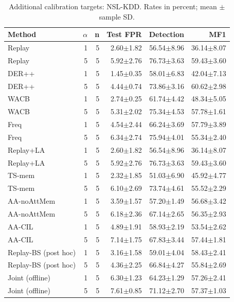 \begin{table}[t]
\centering\scriptsize
\setlength{\tabcolsep}{3.8pt}
\caption{Additional calibration targets: NSL-KDD. Rates in percent; mean $\pm$ sample SD.}\label{tab:alpha-nsl}
\begin{tabular}{lrrrrr}
\toprule
Method & $\alpha$ & n & Test FPR & Detection & MF1 \\
\midrule
Replay & 1 & 5 & 2.60$\pm$1.82 & 56.54$\pm$8.96 & 36.14$\pm$8.07 \\
Replay & 5 & 5 & 5.92$\pm$2.76 & 76.73$\pm$3.63 & 59.43$\pm$3.60 \\
DER++ & 1 & 5 & 1.45$\pm$0.35 & 58.01$\pm$6.83 & 42.04$\pm$7.13 \\
DER++ & 5 & 5 & 4.44$\pm$0.74 & 73.86$\pm$3.16 & 60.62$\pm$2.98 \\
WACB & 1 & 5 & 2.74$\pm$0.25 & 61.74$\pm$4.42 & 48.34$\pm$5.05 \\
WACB & 5 & 5 & 5.31$\pm$2.02 & 75.34$\pm$4.53 & 57.78$\pm$1.61 \\
Freq & 1 & 5 & 4.54$\pm$2.44 & 66.24$\pm$3.69 & 57.79$\pm$3.89 \\
Freq & 5 & 5 & 6.34$\pm$2.74 & 75.94$\pm$4.01 & 55.34$\pm$2.40 \\
Replay+LA & 1 & 5 & 2.60$\pm$1.82 & 56.54$\pm$8.96 & 36.14$\pm$8.07 \\
Replay+LA & 5 & 5 & 5.92$\pm$2.76 & 76.73$\pm$3.63 & 59.43$\pm$3.60 \\
TS-mem & 1 & 5 & 2.32$\pm$1.85 & 51.03$\pm$6.90 & 45.92$\pm$4.77 \\
TS-mem & 5 & 5 & 6.10$\pm$2.69 & 73.74$\pm$4.61 & 55.52$\pm$2.29 \\
AA-noAttMem & 1 & 5 & 3.59$\pm$1.57 & 57.20$\pm$1.49 & 56.68$\pm$3.42 \\
AA-noAttMem & 5 & 5 & 6.18$\pm$2.36 & 67.14$\pm$2.65 & 56.35$\pm$2.93 \\
AA-CIL & 1 & 5 & 4.89$\pm$1.91 & 58.93$\pm$2.19 & 53.54$\pm$2.62 \\
AA-CIL & 5 & 5 & 7.14$\pm$1.75 & 67.83$\pm$3.44 & 57.44$\pm$1.81 \\
Replay-BS (post hoc) & 1 & 5 & 3.16$\pm$1.58 & 59.01$\pm$4.04 & 58.43$\pm$2.41 \\
Replay-BS (post hoc) & 5 & 5 & 4.36$\pm$2.25 & 66.84$\pm$4.27 & 55.84$\pm$2.69 \\
Joint (offline) & 1 & 5 & 6.30$\pm$1.23 & 64.23$\pm$1.29 & 57.26$\pm$2.41 \\
Joint (offline) & 5 & 5 & 7.61$\pm$0.85 & 71.12$\pm$2.70 & 57.37$\pm$1.03 \\
\bottomrule
\end{tabular}
\end{table}
